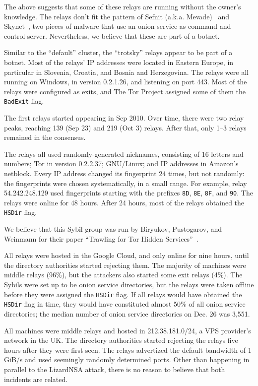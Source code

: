 The above suggests that some of these relays are running without the owner's
knowledge.  The relays don't fit the pattern of Sefnit (a.k.a.
Mevade)~\cite{sefnit} and Skynet~\cite{skynet}, two pieces of malware that use
an onion service as command and control server.  Nevertheless, we believe that
these are part of a botnet.

Similar to the ``default'' cluster, the ``trotsky'' relays appear to be part of
a botnet.  Most of the relays' IP addresses were located in Eastern Europe, in
particular in Slovenia, Croatia, and Bosnia and Herzegovina.  The relays were
all running on Windows, in version 0.2.1.26, and listening on port 443.  Most of
the relays were configured as exits, and The Tor Project assigned some of them
the \texttt{BadExit} flag.

The first relays started appearing in Sep 2010.  Over time, there were two relay
peaks, reaching 139 (Sep 23) and 219 (Oct 3) relays.  After that, only 1--3
relays remained in the consensus.

The relays all used randomly-generated nicknames, consisting of 16 letters and
numbers; Tor in version 0.2.2.37; GNU/Linux; and IP addresses in Amazon's
netblock.  Every IP address changed its fingerprint 24 times, but not randomly:
the fingerprints were chosen systematically, in a small range.  For example,
relay 54.242.248.129 used fingerprints starting with the prefixes \texttt{8D},
\texttt{8E}, \texttt{8F}, and \texttt{90}.  The relays were online for 48 hours.
After 24 hours, most of the relays obtained the \texttt{HSDir} flag.

We believe that this Sybil group was run by Biryukov, Pustogarov, and Weinmann
for their paper ``Trawling for Tor Hidden Services''~\cite{Biryukov2013a}.

All relays were hosted in the Google Cloud, and only online for nine hours,
until the directory authorities started rejecting them.  The majority of
machines were middle relays (96\%), but the attackers also started some exit
relays (4\%).  The Sybils were set up to be onion service directories, but the
relays were taken offline before they were assigned the \texttt{HSDir} flag.  If
all relays would have obtained the \texttt{HSDir} flag in time, they would have
constituted almost 50\% of all onion service directories; the median number of
onion service directories on Dec. 26 was 3,551.

All machines were middle relays and hosted in 212.38.181.0/24, a VPS provider's
network in the UK.  The directory authorities started rejecting the relays five
hours after they were first seen.  The relays advertized the default bandwidth
of 1 GiB/s and used seemingly randomly determined ports.  Other than happening
in parallel to the LizardNSA attack, there is no reason to believe that both
incidents are related.

